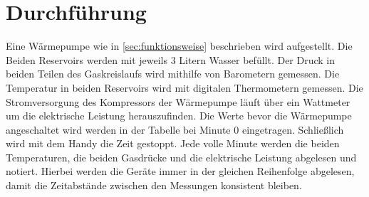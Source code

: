 \section{Durchführung}

Eine Wärmepumpe wie in \ref{sec:funktionsweise} beschrieben wird aufgestellt.
Die Beiden Reservoirs werden mit jeweils 3 Litern Wasser befüllt.
Der Druck in beiden Teilen des Gaskreislaufs wird mithilfe von Barometern gemessen.
Die Temperatur in beiden Reservoirs wird mit digitalen Thermometern gemessen.
Die Stromversorgung des Kompressors der Wärmepumpe läuft über ein Wattmeter um die elektrische Leistung herauszufinden.
Die Werte bevor die Wärmepumpe angeschaltet wird werden in der Tabelle bei Minute 0 eingetragen.
Schließlich wird mit dem Handy die Zeit gestoppt.
Jede volle Minute werden die beiden Temperaturen, die beiden Gasdrücke und die elektrische Leistung abgelesen und notiert.
Hierbei werden die Geräte immer in der gleichen Reihenfolge abgelesen, 
damit die Zeitabstände zwischen den Messungen konsistent bleiben.